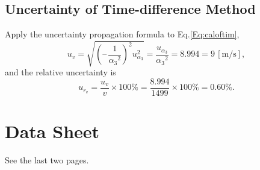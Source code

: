 \documentclass[a4paper]{article}
\begin{document}
\subsection{Uncertainty of Time-difference Method}
Apply the uncertainty propagation formula to Eq.\ref{Eq:caloftim},
\[u_v = \sqrt{{(\text{--}\,\frac{1}{{\alpha_3}^2})}^2 u_{\alpha_3}^2} = \frac{u_{\alpha_3}}{{\alpha_3}^2} =  8.994 = 9 \,[\text{m/s}],\]
and the relative uncertainty is
\[u_{r_v} = \frac{u_v}{v}\times 100\% = \frac{8.994}{1499}\times 100\% = 0.60\%.\]



\section{Data Sheet}

See the last two pages.


\end{document}
